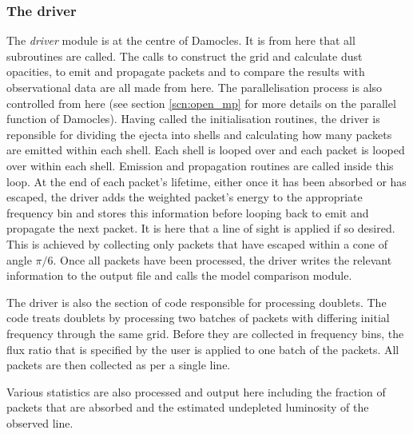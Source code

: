 		\subsubsection{The driver}
		The \textit{driver} module is at the centre of Damocles.  It is from here that all subroutines are called.  The calls to construct the grid and calculate dust opacities, to emit and propagate packets and to compare the results with observational data are all made from here.  The parallelisation process is also controlled from here (see section \ref{scn:open_mp} for more details on the parallel function of Damocles).  Having called the initialisation routines, the driver is reponsible for dividing the ejecta into shells and calculating how many packets are emitted within each shell.  Each shell is looped over and each packet is looped over within each shell. Emission and propagation routines are called inside this loop.  At the end of each packet's lifetime, either once it has been absorbed or has escaped, the driver adds the weighted packet's energy to the appropriate frequency bin and stores this information before looping back to emit and propagate the next packet.  It is here that a line of sight is applied if so desired.  This is achieved by collecting only packets that have escaped within a cone of angle $\pi/6$.  Once all packets have been processed, the driver writes the relevant information to the output file and calls the model comparison module.  
	
		The driver is also the section of code responsible for processing doublets.  The code treats doublets by processing two batches of packets with differing initial frequency through the same grid.  Before they are collected in frequency bins, the flux ratio that is specified by the user is applied to one batch of the packets.  All packets are then collected as per a single line. 
		
		Various statistics are also processed and output here including the fraction of packets that are absorbed and the estimated undepleted luminosity of the observed line. 
		
